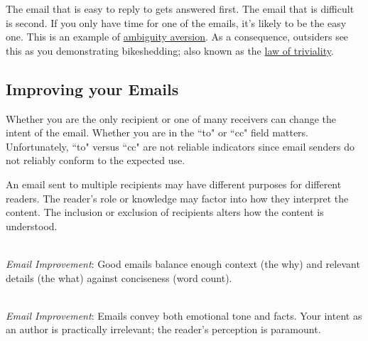 The email that is easy to reply to gets answered first.  The email that is difficult is second.
If you only have time for one of the emails, it's likely to be the easy one. This is an example of 
\href{https://en.wikipedia.org/wiki/Ambiguity_aversion}{ambiguity aversion}.
\iftoggle{WPinmargin}{\marginpar{[Wikipedia] Ambiguity\\aversion}}{}
As a consequence, outsiders see this as you demonstrating bikeshedding; also known as the
\href{https://en.wikipedia.org/wiki/Law_of_triviality}{law of triviality}.



\subsection*{Improving your Emails\label{sec:email-structure}}


Whether you are the only recipient or one of many receivers can change the intent of the email. Whether you are in the ``to" or ``cc" field matters. Unfortunately, ``to" versus ``cc" are not reliable indicators since email senders do not reliably conform to the expected use. 



An email sent to multiple recipients may have different purposes for different readers. The reader's role or knowledge may factor into how they interpret the content. The inclusion or exclusion of recipients alters how the content is understood. 

\ \\
\textit{Email Improvement}: Good emails balance enough context (the why) and relevant details (the what) against conciseness (word count). 

\ \\
\textit{Email Improvement}: Emails convey both emotional tone and facts. Your intent as an author is practically irrelevant; the reader's perception is paramount. 


